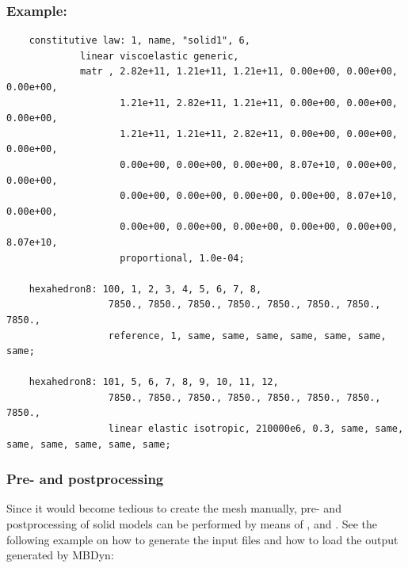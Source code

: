 \subsubsection{Example:}
\begin{verbatim}
    constitutive law: 1, name, "solid1", 6,
             linear viscoelastic generic,
             matr , 2.82e+11, 1.21e+11, 1.21e+11, 0.00e+00, 0.00e+00, 0.00e+00,
                    1.21e+11, 2.82e+11, 1.21e+11, 0.00e+00, 0.00e+00, 0.00e+00,
                    1.21e+11, 1.21e+11, 2.82e+11, 0.00e+00, 0.00e+00, 0.00e+00,
                    0.00e+00, 0.00e+00, 0.00e+00, 8.07e+10, 0.00e+00, 0.00e+00,
                    0.00e+00, 0.00e+00, 0.00e+00, 0.00e+00, 8.07e+10, 0.00e+00,
                    0.00e+00, 0.00e+00, 0.00e+00, 0.00e+00, 0.00e+00, 8.07e+10,
                    proportional, 1.0e-04;

    hexahedron8: 100, 1, 2, 3, 4, 5, 6, 7, 8,
                  7850., 7850., 7850., 7850., 7850., 7850., 7850., 7850.,
                  reference, 1, same, same, same, same, same, same, same;

    hexahedron8: 101, 5, 6, 7, 8, 9, 10, 11, 12,
                  7850., 7850., 7850., 7850., 7850., 7850., 7850., 7850.,
                  linear elastic isotropic, 210000e6, 0.3, same, same, same, same, same, same, same;
\end{verbatim}

\subsubsection{Pre- and postprocessing}
Since it would become tedious to create the mesh manually, pre- and postprocessing of solid models
can be performed by means of ,
and .
See the following example on how to generate the input files and how to load the output generated by MBDyn:

